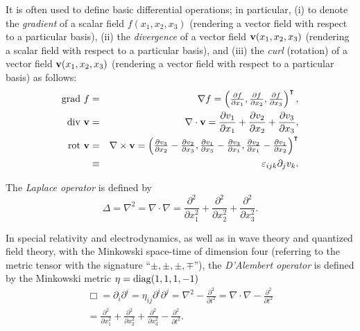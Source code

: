 It is often used to define basic differential operations;
in particular, (i) to denote the {\em gradient} of a scalar field $f(x_1,x_2,x_3)$ (rendering a vector field with respect to a particular basis),
(ii) the {\em divergence} of a vector field ${\bf v}(x_1,x_2,x_3)$
(rendering a scalar field with respect to a particular basis), and
(iii) the {\em curl} (rotation) of a vector field  ${\bf v}(x_1,x_2,x_3)$ (rendering a vector field with respect to a particular basis)
as follows:
\begin{eqnarray}
\textrm{grad } f &=& \nabla f =\begin{pmatrix}
\frac{\partial f}{\partial x_1},
\frac{\partial f}{\partial x_2},
\frac{\partial f}{\partial x_3}
\end{pmatrix}^\intercal   ,\\
\textrm{div }  {\bf v} &=& \nabla \cdot {\bf v} =
\frac{\partial v_1}{\partial x_1}+
\frac{\partial v_2}{\partial x_2}+
\frac{\partial v_3}{\partial x_3}
  ,\\
\textrm{rot } {\bf v} &=& \nabla \times {\bf v} = \begin{pmatrix}
\frac{\partial v_3}{\partial x_2}-
\frac{\partial v_2}{\partial x_3}
,
\frac{\partial v_1}{\partial x_3}-
\frac{\partial v_3}{\partial x_1}
,
\frac{\partial v_2}{\partial x_1}-
\frac{\partial v_1}{\partial x_2}
\end{pmatrix}^\intercal           \\
&\equiv& \varepsilon_{ijk} \partial_j v_k.
\end{eqnarray}

The {\em Laplace operator}
is defined by
\begin{equation}
\Delta = \nabla^2= \nabla \cdot \nabla =
\frac{\partial^2 }{\partial  x_1 ^2}+
\frac{\partial^2 }{\partial  x_2 ^2}+
\frac{\partial^2 }{\partial  x_3 ^2}
.
\end{equation}

In special relativity and electrodynamics,  as well as in  wave theory and quantized field theory, with the Minkowski space-time
of dimension four
(referring to the metric tensor with the signature ``$\pm ,\pm ,\pm ,\mp$''),
the {\em D'Alembert operator}
is defined by the Minkowski metric $\eta = {\rm diag} (1,1,1,-1)$
\begin{equation}
\begin{split}
\Box  = \partial_i \partial^i
=
\eta_{ij}  \partial^i \partial^j=
\nabla^2- \frac{\partial^2 }{\partial t^2}=
\nabla \cdot \nabla - \frac{\partial^2 }{\partial t^2}\\
=
\frac{\partial^2 }{\partial  x_1^2}+
\frac{\partial^2 }{\partial  x_2^2}+
\frac{\partial^2 }{\partial  x_3^2}- \frac{\partial^2 }{\partial t^2}
.
\end{split}
\end{equation}


